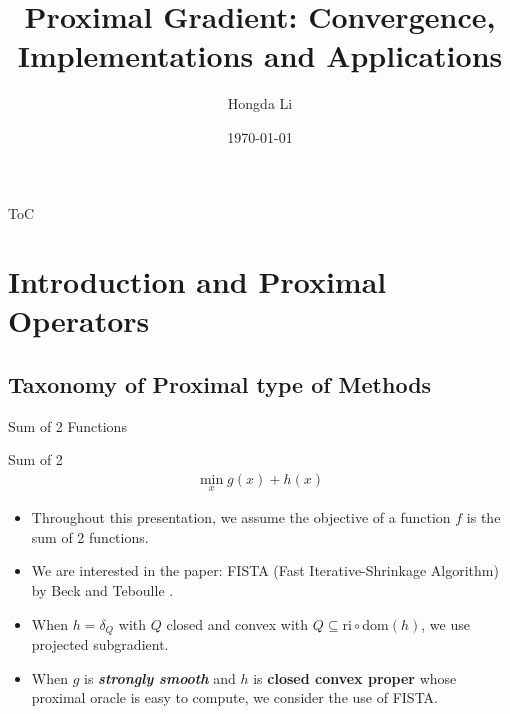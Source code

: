 \documentclass[11pt]{beamer}
\author{Hongda Li}
\title{Proximal Gradient: Convergence, Implementations and Applications}
\institute[]{UBC Okanagan}
\date{\today}
\begin{document}
\begin{frame}
    \titlepage
\end{frame}

\begin{frame}{ToC}
    \tableofcontents
\end{frame}

\section{Introduction and Proximal Operators}
    \subsection{Taxonomy of Proximal type of Methods}
        \begin{frame}{Sum of 2 Functions}
            \begin{block}{Sum of 2}
                \begin{align}
                    \min_{x} g(x) + h(x)
                \end{align}    
            \end{block}
            
            \begin{itemize}
                \item [1.]Throughout this presentation, we assume the objective of a function $f$ is the sum of 2 functions.
                \item [2.]We are interested in the paper: FISTA (Fast Iterative-Shrinkage Algorithm) by Beck and Teboulle \cite{paper:FISTA}. 
            \end{itemize}
            
            \begin{itemize}
                \item [1.] When $h = \delta_Q$ with $Q$ closed and convex with $Q\subseteq \text{ri}\circ \text{dom}(h)$, we use projected subgradient. 
                \item [2.] When $g$ is \textbf{\emph{strongly smooth}} and $h$ is \textbf{closed convex proper} whose proximal oracle is easy to compute, we consider the use of FISTA. 
                
            \end{itemize}
        \end{frame}
\end{document}
